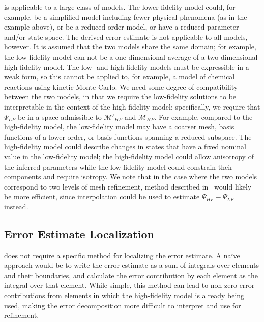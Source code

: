  is applicable to a large class of models. The lower-fidelity model could, for example, be a simplified model including fewer physical phenomena (as in the example above), or be a reduced-order model, or have a reduced parameter and/or state space. The derived error estimate is not applicable to all models, however. It is assumed that the two models share the same domain; for example, the low-fidelity model can not be a one-dimensional average of a two-dimensional high-fidelity model. The low- and high-fidelity models must be expressible in a weak form, so this cannot be applied to, for example, a model of chemical reactions using kinetic Monte Carlo. We need some degree of compatibility between the two models, in that we require the low-fidelity solutions to be interpretable in the context of the high-fidelity model; specifically, we require that $\Psi_{LF}$ be in a space admissible to $\mathcal{M}'_{HF}$ and $\mathcal{M}_{HF}$. For example, compared to the high-fidelity model, the low-fidelity model may have a coarser mesh, basis functions of a lower order, or basis functions spanning a reduced subspace. The high-fidelity model could describe changes in states that have a fixed nominal value in the low-fidelity model; the high-fidelity model could allow anisotropy of the inferred parameters while the low-fidelity model could constrain their components and require isotropy. We note that in the case where the two models correspond to two levels of mesh refinement, method described in~\cite{BecVex05} would likely be more efficient, since interpolation could be used to estimate $\Psi_{HF}-\Psi_{LF}$ instead.

\subsection{Error Estimate Localization}\label{sec:errLocal}

 does not require a specific method for localizing the error estimate. A na\"{i}ve approach would be to write the error estimate as a sum of integrals over elements and their boundaries, and calculate the error contribution by each element as the integral over that element. While simple, this method can lead to non-zero error contributions from elements in which the high-fidelity model is already being used, making the error decomposition more difficult to interpret and use for refinement.

